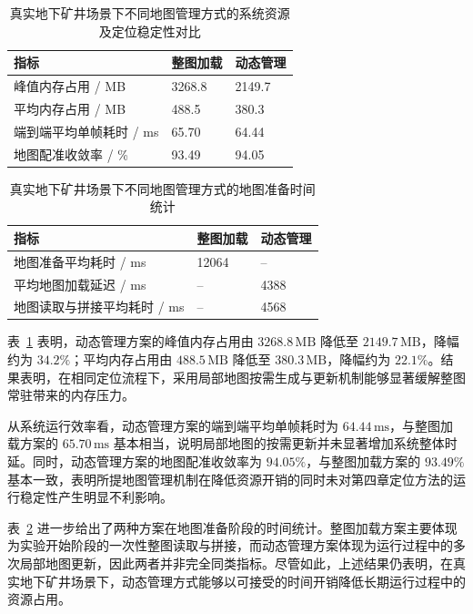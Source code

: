 \begin{table}[htbp]
    \centering
    \caption{真实地下矿井场景下不同地图管理方式的系统资源及定位稳定性对比}
    \label{tab:ch5_resource_compare}
    \small
    \renewcommand{\arraystretch}{1.15}
    \begin{tabular}{p{4.6cm}p{2.2cm}p{2.2cm}}
        \toprule
        指标 & 整图加载 & 动态管理 \\
        \midrule
        峰值内存占用 / MB & 3268.8 & 2149.7 \\
        平均内存占用 / MB & 488.5 & 380.3 \\
        端到端平均单帧耗时 / ms & 65.70 & 64.44 \\
        地图配准收敛率 / \% & 93.49 & 94.05 \\
        \bottomrule
    \end{tabular}
\end{table}

\begin{table}[htbp]
    \centering
    \caption{真实地下矿井场景下不同地图管理方式的地图准备时间统计}
    \label{tab:ch5_loading_time_compare}
    \small
    \renewcommand{\arraystretch}{1.15}
    \begin{tabular}{p{4.6cm}p{2.2cm}p{2.2cm}}
        \toprule
        指标 & 整图加载 & 动态管理 \\
        \midrule
        地图准备平均耗时 / ms & 12064 & -- \\
        平均地图加载延迟 / ms & -- & 4388 \\
        地图读取与拼接平均耗时 / ms & -- & 4568 \\
        \bottomrule
    \end{tabular}
\end{table}

表~\ref{tab:ch5_resource_compare} 表明，动态管理方案的峰值内存占用由 $3268.8\,\mathrm{MB}$ 降低至 $2149.7\,\mathrm{MB}$，降幅约为 $34.2\%$；平均内存占用由 $488.5\,\mathrm{MB}$ 降低至 $380.3\,\mathrm{MB}$，降幅约为 $22.1\%$。结果表明，在相同定位流程下，采用局部地图按需生成与更新机制能够显著缓解整图常驻带来的内存压力。

从系统运行效率看，动态管理方案的端到端平均单帧耗时为 $64.44\,\mathrm{ms}$，与整图加载方案的 $65.70\,\mathrm{ms}$ 基本相当，说明局部地图的按需更新并未显著增加系统整体时延。同时，动态管理方案的地图配准收敛率为 $94.05\%$，与整图加载方案的 $93.49\%$ 基本一致，表明所提地图管理机制在降低资源开销的同时未对第四章定位方法的运行稳定性产生明显不利影响。

表~\ref{tab:ch5_loading_time_compare} 进一步给出了两种方案在地图准备阶段的时间统计。整图加载方案主要体现为实验开始阶段的一次性整图读取与拼接，而动态管理方案体现为运行过程中的多次局部地图更新，因此两者并非完全同类指标。尽管如此，上述结果仍表明，在真实地下矿井场景下，动态管理方式能够以可接受的时间开销降低长期运行过程中的资源占用。

